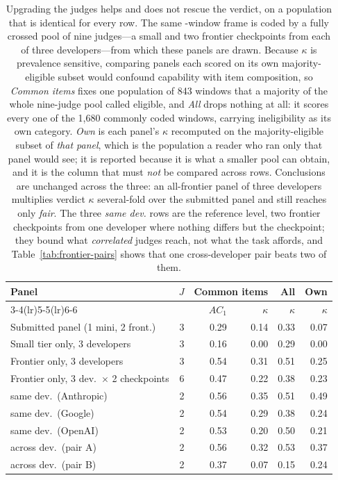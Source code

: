 \begin{table}[t]
\centering\scriptsize
\setlength{\tabcolsep}{3pt}
\begin{tabular}{@{}lrrrrr@{}}
\toprule
Panel & $J$ & \multicolumn{2}{c}{Common items} & All & Own \\
\cmidrule(lr){3-4}\cmidrule(lr){5-5}\cmidrule(lr){6-6}
 & & $AC_1$ & $\kappa$ & $\kappa$ & $\kappa$ \\
\midrule
Submitted panel (1 mini, 2 front.) & 3 & 0.29 & 0.14 & 0.33 & 0.07 \\
Small tier only, 3 developers & 3 & 0.16 & 0.00 & 0.29 & 0.00 \\
Frontier only, 3 developers & 3 & 0.54 & 0.31 & 0.51 & 0.25 \\
Frontier only, 3 dev.\ $\times$ 2 checkpoints & 6 & 0.47 & 0.22 & 0.38 & 0.23 \\
\quad same dev.\ (Anthropic) & 2 & 0.56 & 0.35 & 0.51 & 0.49 \\
\quad same dev.\ (Google) & 2 & 0.54 & 0.29 & 0.38 & 0.24 \\
\quad same dev.\ (OpenAI) & 2 & 0.53 & 0.20 & 0.50 & 0.21 \\
\quad across dev.\ (pair A) & 2 & 0.56 & 0.32 & 0.53 & 0.37 \\
\quad across dev.\ (pair B) & 2 & 0.37 & 0.07 & 0.15 & 0.24 \\
\bottomrule
\end{tabular}
\caption{Upgrading the judges helps and does not rescue the verdict, on a population that is identical for every row. The same \FrameCandidates{}-window frame is coded by a fully crossed pool of nine judges---a small and two frontier checkpoints from each of three developers---from which these panels are drawn. Because $\kappa$ is prevalence sensitive, comparing panels each scored on its own majority-eligible subset would confound capability with item composition, so \emph{Common items} fixes one population of 843 windows that a majority of the whole nine-judge pool called eligible, and \emph{All} drops nothing at all: it scores every one of the 1,680 commonly coded windows, carrying ineligibility as its own category. \emph{Own} is each panel's $\kappa$ recomputed on the majority-eligible subset of \emph{that panel}, which is the population a reader who ran only that panel would see; it is reported because it is what a smaller pool can obtain, and it is the column that must \emph{not} be compared across rows. Conclusions are unchanged across the three: an all-frontier panel of three developers multiplies verdict $\kappa$ several-fold over the submitted panel and still reaches only \emph{fair}. The three \emph{same dev.} rows are the reference level, two frontier checkpoints from one developer where nothing differs but the checkpoint; they bound what \emph{correlated} judges reach, not what the task affords, and Table~\ref{tab:frontier-pairs} shows that one cross-developer pair beats two of them.}
\label{tab:tier-control}
\end{table}
